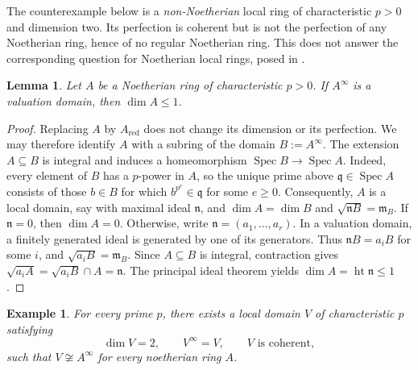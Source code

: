 \documentclass[11pt,a4paper]{amsart}
\numberwithin{equation}{section}
\newtheorem{lemma}[theorem]{Lemma}
\newtheorem{example}[theorem]{Example}\newtheorem{notation}[theorem]{Notation}
\newcommand{\Spec}{\operatorname{Spec}}
\begin{document}
 
 
 
 
 The counterexample below is a \emph{non-Noetherian} local ring of
 characteristic $p>0$ and dimension two. Its perfection is coherent but
 is not the perfection of any Noetherian ring, hence of no regular
 Noetherian ring. This does not answer the corresponding question for
 Noetherian local rings, posed in \cite{Shim}.  
 
 \begin{lemma}\label{lem:obstruction}
 	Let $A$ be a Noetherian ring of characteristic $p>0$.
 	If $A^\infty$ is a valuation domain, then $\dim A\leq 1$.
 \end{lemma}
 
 \begin{proof}
 Replacing $A$ by $A_{\mathrm{red}}$ does not change its dimension
or its perfection. We may therefore identify $A$ with a subring of
the domain $B:=A^\infty$.
 The extension $A\subseteq B$ is integral and induces a homeomorphism
$\Spec B\longrightarrow\Spec A$. Indeed, every element of $B$	has a $p$-power in $A$, so the unique prime above
$\mathfrak q\in\Spec A$ consists of those $b\in B$ for which	$b^{p^e}\in\mathfrak q$ for some $e\geq0$.
Consequently, $A$ is a local domain, say with maximal ideal
$\mathfrak n$, and
$\dim A=\dim B$ and $ \sqrt{\mathfrak nB}=\mathfrak m_B.$	If $\mathfrak n=0$, then $\dim A=0$.
Otherwise, write $\mathfrak n=(a_1,\ldots,a_r)$.
In a valuation domain, a finitely generated ideal is generated by one
of its generators. Thus $\mathfrak nB=a_iB$ for some $i$, and	$\sqrt{a_iB}=\mathfrak m_B.$	Since $A\subseteq B$ is integral, contraction gives	$\sqrt{a_iA}=\sqrt{a_iB}\cap A=\mathfrak n.$	The principal ideal theorem yields
$\dim A=\operatorname{ht}\mathfrak n\leq1$.
 \end{proof}
 
 \begin{example}\label{thm:example}
 For every prime $p$, there exists a local domain $V$ of
characteristic $p$ satisfying
$$\dim V=2,\qquad V^\infty=V,\qquad V\text{ is coherent},$$
 such that $V\not\cong A^\infty$ for every noetherian ring $A$.
 \end{example}
 
\end{document}

